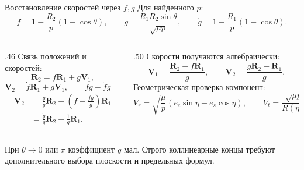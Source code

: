\documentclass[11pt,aspectratio=169,t]{beamer}
\newcommand{\eqcompact}{\fontsize{10}{12}\selectfont}
\newcommand{\derivationmathspacing}{%
  \setlength{\abovedisplayskip}{2pt}%
  \setlength{\belowdisplayskip}{3pt}%
  \setlength{\abovedisplayshortskip}{2pt}%
  \setlength{\belowdisplayshortskip}{2pt}%
  \setlength{\jot}{2pt}}
\newcommand{\vect}[1]{\boldsymbol{#1}}
\begin{document}
\begin{frame}{Восстановление скоростей через $f,g$}
\relax\derivationmathspacing
Для найденного $p$:
{\eqcompact\derivationmathspacing
\[
 f=1-\frac{R_2}{p}(1-\cos\theta),\qquad
 g=\frac{R_1R_2\sin\theta}{\sqrt{\mu p}},\qquad
 \dot g=1-\frac{R_1}{p}(1-\cos\theta).
\]
}
\begin{columns}[T,onlytextwidth]
\begin{column}{.46\textwidth}
Связь положений и скоростей:
{\eqcompact\derivationmathspacing
\[
 \vect R_2=f\vect R_1+g\vect V_1,
\]
\[
 \vect V_2=\dot f\vect R_1+\dot g\vect V_1,
 \qquad f\dot g-\dot f g=1.
\]
\[
 \begin{aligned}
 \vect V_2&=\frac{\dot g}{g}\vect R_2
 +\left(\dot f-\frac{f\dot g}{g}\right)\vect R_1\\[3pt]
 &=\frac{\dot g}{g}\vect R_2-\frac1g\vect R_1.
 \end{aligned}
\]
}
\end{column}
\begin{column}{.50\textwidth}
Скорости получаются алгебраически:
{\eqcompact\derivationmathspacing
\[
 \boxed{\vect V_1=\frac{\vect R_2-f\vect R_1}{g},\qquad
 \vect V_2=\frac{\dot g\vect R_2-\vect R_1}{g}.}
\]
}
Геометрическая проверка компонент:
{\eqcompact\derivationmathspacing
\[
 V_r=\sqrt{\frac\mu p}(e_c\sin\eta-e_s\cos\eta),
 \qquad V_t=\frac{\sqrt{\mu p}}{R(\eta)}.
\]
}
\end{column}
\end{columns}
\smallskip
\justifying
При $\theta\to0$ или $\pi$ коэффициент $g$ мал.
Строго коллинеарные концы требуют дополнительного выбора плоскости и предельных формул.
\end{frame}
\end{document}
